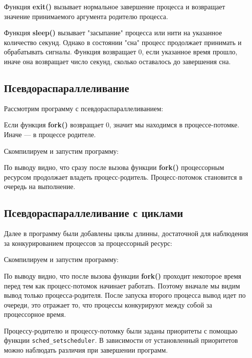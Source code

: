 \documentclass[a4paper]{article}
\begin{document}
	Функция \textbf{exit()} вызывает нормальное завершение процесса и возвращает значение принимаемого аргумента родителю процесса.
	
	Функция \textbf{sleep()} вызывает "засыпание" процесса или нити на указанное количество секунд. Однако в состоянии "сна" процесс продолжает принимать и обрабатывать сигналы. Функция возвращает 0, если указанное время прошло, иначе она возвращает число секунд, сколько оставалось до завершения сна.
	
\subsection{Псевдораспараллеливание}
	Рассмотрим программу с псевдораспараллеливанием:
	
	
	Если функция \textbf{fork()} возвращает 0, значит мы находимся в процессе-потомке. Иначе --- в процессе родителе.
	
	Скомпилируем и запустим программу:
	
	
	По выводу видно, что сразу после вызова функции \textbf{fork()} процессорным ресурсом продолжает владеть процесс-родитель. Процесс-потомок становится в очередь на выполнение.

\subsection{Псевдораспараллеливание с циклами}
	Далее в программу были добавлены циклы длинны, достаточной для наблюдения за конкурированием процессов за процессорный ресурс:
	

	Скомпилируем и запустим программу:
	
	
	По выводу видно, что после вызова функции \textbf{fork()} проходит некоторое время перед тем как процесс-потомок начинает работать. Поэтому вначале мы видим вывод только процесса-родителя. После запуска второго процесса вывод идет по очереди, это отражает то, что процессы конкурируют между собой за процессорное время.
	
	Процессу-родителю и процессу-потомку были заданы приоритеты с помощью функции \texttt{sched\_setscheduler}. В зависимости от установленный приоритетов можно наблюдать различия при завершении программ.
	
	
\end{document}
